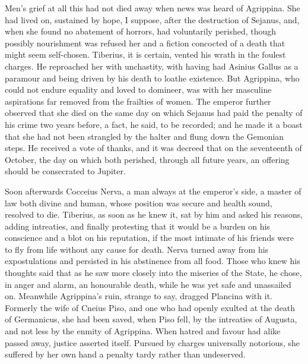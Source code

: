 
Men's grief at all this had not died away when news was heard of Agrippina. She had lived on, sustained by hope, I suppose, after the destruction of Sejanus, and, when she found no abatement of horrors, had voluntarily perished, though possibly nourishment was refused her and a fiction concocted of a death that might seem self-chosen. Tiberius, it is certain, vented his wrath in the foulest charges. He reproached her with unchastity, with having had Asinius Gallus as a paramour and being driven by his death to loathe existence. But Agrippina, who could not endure equality and loved to domineer, was with her masculine aspirations far removed from the frailties of women. The emperor further observed that she died on the same day on which Sejanus had paid the penalty of his crime two years before, a fact, he said, to be recorded; and he made it a boast that she had not been strangled by the halter and flung down the Gemonian steps. He received a vote of thanks, and it was decreed that on the seventeenth of October, the day on which both perished, through all future years, an offering should be consecrated to Jupiter.


Soon afterwards Cocceius Nerva, a man always at the emperor's side, a master of law both divine and human, whose position was secure and health sound, resolved to die. Tiberius, as soon as he knew it, sat by him and asked his reasons, adding intreaties, and finally protesting that it would be a burden on his conscience and a blot on his reputation, if the most intimate of his friends were to fly from life without any cause for death. Nerva turned away from his expostulations and persisted in his abstinence from all food. Those who knew his thoughts said that as he saw more closely into the miseries of the State, he chose, in anger and alarm, an honourable death, while he was yet safe and unassailed on. Meanwhile Agrippina's ruin, strange to say, dragged Plancina with it. Formerly the wife of Cneius Piso, and one who had openly exulted at the death of Germanicus, she had been saved, when Piso fell, by the intreaties of Augusta, and not less by the enmity of Agrippina. When hatred and favour had alike passed away, justice asserted itself. Pursued by charges universally notorious, she suffered by her own hand a penalty tardy rather than undeserved.


